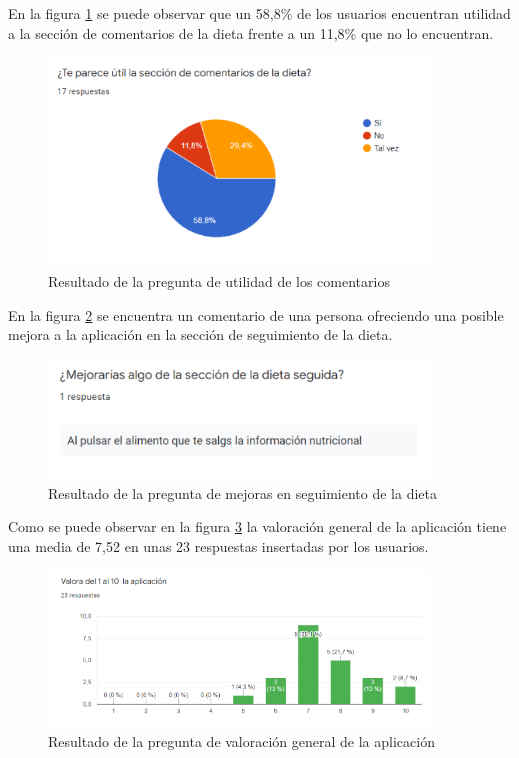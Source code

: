 En la figura \ref{fig:grafico_10} se puede observar que un 58,8\% de los usuarios encuentran utilidad a la sección de comentarios de la dieta frente a un 11,8\% que no lo encuentran.

\begin{figure}[H]
    \centering
    \includegraphics[width=0.9\textwidth]{Images/Capitulo8/Capitulo8.2/grafico10.png}
    \caption{Resultado de la pregunta de utilidad de los comentarios}
    \label{fig:grafico_10}
\end{figure}

En la figura \ref{fig:grafico_11} se encuentra un comentario de una persona ofreciendo una posible mejora a la aplicación en la sección de seguimiento de la dieta.

\begin{figure}[H]
    \centering
    \includegraphics[width=0.9\textwidth]{Images/Capitulo8/Capitulo8.2/grafico11.png}
    \caption{Resultado de la pregunta de mejoras en seguimiento de la dieta}
    \label{fig:grafico_11}
\end{figure}
Como se puede observar en la figura \ref{fig:grafico_12} la valoración general de la aplicación tiene una media de 7,52  en unas 23 respuestas insertadas por los usuarios.

\begin{figure}[H]
    \centering
    \includegraphics[width=0.9\textwidth]{Images/Capitulo8/Capitulo8.2/grafico12.png}
    \caption{Resultado de la pregunta de valoración general de la aplicación}
    \label{fig:grafico_12}
\end{figure}

